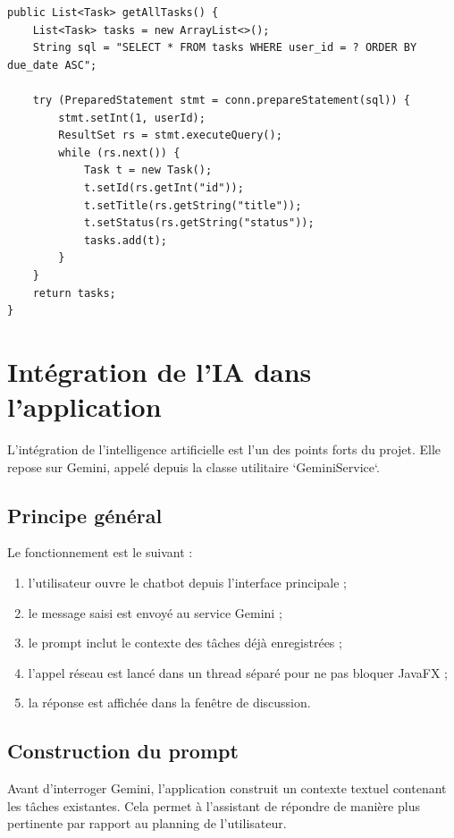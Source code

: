 \documentclass[11pt,a4paper]{article}
\begin{document}
\begin{lstlisting}[style=javaStyle,caption={Récupération des tâches de l'utilisateur connecté}]
public List<Task> getAllTasks() {
    List<Task> tasks = new ArrayList<>();
    String sql = "SELECT * FROM tasks WHERE user_id = ? ORDER BY due_date ASC";

    try (PreparedStatement stmt = conn.prepareStatement(sql)) {
        stmt.setInt(1, userId);
        ResultSet rs = stmt.executeQuery();
        while (rs.next()) {
            Task t = new Task();
            t.setId(rs.getInt("id"));
            t.setTitle(rs.getString("title"));
            t.setStatus(rs.getString("status"));
            tasks.add(t);
        }
    }
    return tasks;
}
\end{lstlisting}

\section{Intégration de l'IA dans l'application}

L'intégration de l'intelligence artificielle est l'un des points forts du projet. Elle repose sur Gemini, appelé depuis la classe utilitaire `GeminiService`.

\subsection{Principe général}

Le fonctionnement est le suivant :
\begin{enumerate}[leftmargin=1.4em]
    \item l'utilisateur ouvre le chatbot depuis l'interface principale ;
    \item le message saisi est envoyé au service Gemini ;
    \item le prompt inclut le contexte des tâches déjà enregistrées ;
    \item l'appel réseau est lancé dans un thread séparé pour ne pas bloquer JavaFX ;
    \item la réponse est affichée dans la fenêtre de discussion.
\end{enumerate}

\subsection{Construction du prompt}

Avant d'interroger Gemini, l'application construit un contexte textuel contenant les tâches existantes. Cela permet à l'assistant de répondre de manière plus pertinente par rapport au planning de l'utilisateur.
\end{document}
